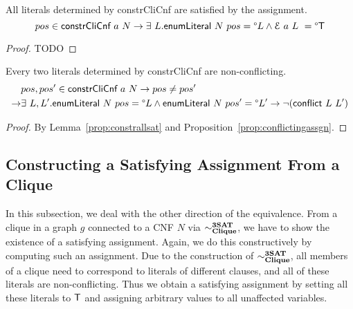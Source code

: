 \documentclass[a4paper,UKenglish,cleveref, autoref]{lipics-v2019}
\begin{document}
\begin{lemma}\label{prop:constrallsat}
  All literals determined by \normalfont\textsf{constrCliCnf} are satisfied by the assignment.
  \[ pos \in \normalfont\textsf{constrCliCnf}~a~N \rightarrow \exists~L. \normalfont\textsf{enumLiteral}~N~pos = \degree L \land \mathcal{E}~a~L~ = \degree\mathsf{T} \]
\end{lemma}
\begin{proof}
  TODO
\end{proof}

\begin{proposition}
  Every two literals determined by \normalfont\textsf{constrCliCnf} are non-conflicting.
  \begin{align*}
    &pos, pos' \in \normalfont\textsf{constrCliCnf}~a~N \rightarrow pos \neq pos' \\
    \rightarrow& \exists~L,L'. \normalfont\textsf{enumLiteral}~N~pos = \degree L \land \normalfont\textsf{enumLiteral}~N~pos' = \degree L' \rightarrow \lnot{(\normalfont\textsf{conflict}~L~L')} 
 \end{align*}
\end{proposition}
\begin{proof}
  By Lemma~\ref{prop:constrallsat} and Proposition~\ref{prop:conflictingassgn}.
\end{proof}

\subsection{Constructing a Satisfying Assignment From a Clique}
In this subsection, we deal with the other direction of the equivalence. From a clique in a graph $g$ connected to a CNF $N$ via $\sim^{\textbf{3SAT}}_{\textbf{Clique}}$, we have to show the existence of a satisfying assignment. Again, we do this constructively by computing such an assignment. Due to the construction of $\sim^{\textbf{3SAT}}_{\textbf{Clique}}$, all members of a clique need to correspond to literals of different clauses, and all of these literals are non-conflicting. Thus we obtain a satisfying assignment by setting all these literals to $\mathsf{T}$ and assigning arbitrary values to all unaffected variables. 
\end{document}
